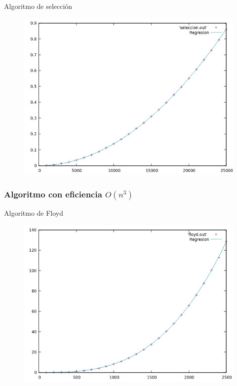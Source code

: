 \documentclass{beamer}
\begin{document}
\begin{frame}[fragile]{Algoritmo de selección}
\begin{figure}[H]
\centering
\includegraphics[scale=0.5]{hibrida_seleccion.png}
\end{figure}
\end{frame}

\subsubsection{Algoritmo con eficiencia $O(n^3)$}
\begin{frame}[fragile]{Algoritmo de Floyd}
\begin{figure}[H]
\centering
\includegraphics[scale=0.5]{hibrida_floyd.png}
\end{figure}
\end{frame}
\end{document}
